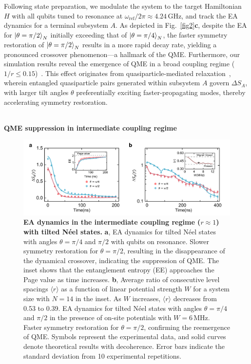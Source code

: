 \documentclass[reprint,superscriptaddress,preprintnumbers,longbibliography,
amsmath,amssymb,aps,floatfix,pra,twocolumn, tightenlines %
]{revtex4-2}
\begin{document}
    Following state preparation, we modulate the system to the target Hamiltonian $ H $ with all qubits tuned to resonance at $\omega_{\mathrm{ref}}/2\pi \approx 4.24 \, \text{GHz}$, and track the EA dynamics for a terminal subsystem $A$. As depicted in Fig.~\ref{fig2}\textbf{c}, despite the EA for $ \ket{\theta= \pi/2}_N $ initially exceeding that of $ \ket{\theta= \pi/4}_N $, the faster symmetry restoration of $ \ket{\theta= \pi/2}_N $ results in a more rapid decay rate, yielding a pronounced crossover phenomenon—a hallmark of the QME. Furthermore, our simulation results reveal the emergence of QME in a broad coupling regime (\( 1/r \leq 0.15 \))~\cite{supp_cite}. This effect originates from quasiparticle-mediated relaxation~\cite{Integrable_PRL,quasiparticle,integrable_arxiv}, wherein entangled quasiparticle pairs generated within subsystem $ A $ govern $ \Delta S_A $, with larger tilt angles $ \theta $ preferentially exciting faster-propagating modes, thereby accelerating symmetry restoration. 

	~\\
	\textbf{\textbf{QME suppression in intermediate coupling regime}}

     \begin{figure}[t]
         \centering
     	\includegraphics[width=1.0\linewidth]{Figure3/Figure3.pdf}
     	\caption{\textbf{EA dynamics in the intermediate coupling regime ($ r \approx 1 $) with tilted Néel states.} \textbf{a}, EA dynamics for tilted Néel states with angles \(\theta = \pi/4\) and \(\pi/2\) with qubits on resonance. Slower symmetry restoration for $\theta = \pi/2$, resulting in the disappearance of the dynamical crossover, indicating the suppression of QME. The inset shows that the entanglement entropy (EE) approaches the Page value as time increases.
     	\textbf{b}, Average ratio of consecutive level spacings \(\langle r \rangle\) as a function of linear potential strength \( W \) for a system size with \( N = 14 \) in the inset. As \( W \) increases, \(\langle r \rangle\) decreases from 0.53 to 0.39. EA dynamics for tilted Néel states with angles \(\theta = \pi/4\) and \(\pi/2\) in the presence of on-site potentials with \( W = 6 \, \text{MHz} \). Faster symmetry restoration for $\theta = \pi/2$, confirming the reemergence of QME. Symbols represent the experimental data, and solid curves denote theoretical results with decoherence. Error bars indicate the standard deviation from 10 experimental repetitions.}

	\label{fig3}
     \end{figure}
\end{document}
